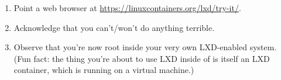 \begin{enumerate}
  \item Point a web browser at \url{https://linuxcontainers.org/lxd/try-it/}.
  \item Acknowledge that you can't/won't do anything terrible.
  \item Observe that you're now root inside your very own LXD-enabled system. (Fun fact: the thing you're about to use LXD inside of is itself an LXD container, which is running on a virtual machine.)
\end{enumerate}
